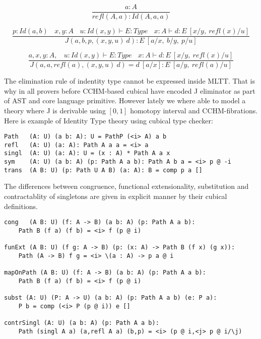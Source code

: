 \documentclass{aip-cp}
\begin{document}
\begin{equation}
\tag{$Id$-intro}
\dfrac
  {a:A}
  {refl(A,a) : Id(A,a,a) }
\end{equation}

\begin{equation}
\tag{$J$-elimination}
\dfrac
  {p:Id(a,b)\ \ \ \ x,y:A\ \ \ \ u:Id(x,y) \vdash E:Type\ \ \ \ x:A \vdash d: E\ [x/y,\ refl(x)/u]}
  {J(a,b,p,(x,y,u)\ d) : E\ [a/x,\ b/y,\ p/u]}
\end{equation}

\begin{equation}
\tag{$Id$-computation}
\dfrac
  {a,x,y:A,\ \ \ \ u:Id(x,y) \vdash E:Type\ \ \ \ x:A \vdash d:E\ [x/y,\ refl(x)/u]}
  {J(a,a,refl(a),(x,y,u)\ d) = d\ [a/x] : E\ [a/y,\ refl(a)/u]}
\end{equation}

The elimination rule of indentity type cannot be expressed inside MLTT. That is why in all provers
before CCHM-based cubical have encoded J eliminator as part of AST and core language primitive.
However lately we where able to model a theory where J is derivable using $[0,1]$
homotopy interval \cite{Mortberg17} and CCHM-fibrations. Here is example of Identity Type theory
using cubical type checker:

\begin{lstlisting}[mathescape=true]
Path   (A: U) (a b: A): U = PathP (<i> A) a b
refl   (A: U) (a: A): Path A a a = <i> a
singl  (A: U) (a: A): U = (x : A) * Path A a x
sym    (A: U) (a b: A) (p: Path A a b): Path A b a = <i> p @ -i
trans  (A B: U) (p: Path U A B) (a: A): B = comp p a []
\end{lstlisting}

\newpage
The differences between congruence, functional extensionality,
substitution and contractablity of singletons are given in explicit manner
by their cubical definitions.

\begin{lstlisting}[mathescape=true]
cong   (A B: U) (f: A -> B) (a b: A) (p: Path A a b):
    Path B (f a) (f b) = <i> f (p @ i)

funExt (A B: U) (f g: A -> B) (p: (x: A) -> Path B (f x) (g x)):
    Path (A -> B) f g = <i> \(a : A) -> p a @ i

mapOnPath (A B: U) (f: A -> B) (a b: A) (p: Path A a b):
    Path B (f a) (f b) = <i> f (p @ i)

subst (A: U) (P: A -> U) (a b: A) (p: Path A a b) (e: P a):
    P b = comp (<i> P (p @ i)) e []

contrSingl (A: U) (a b: A) (p: Path A a b):
    Path (singl A a) (a,refl A a) (b,p) = <i> (p @ i,<j> p @ i/\j)
\end{lstlisting}
\end{document}
